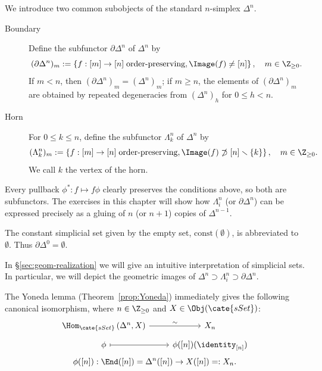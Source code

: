 \begin{example}\label{eg:boundary-horn}
	We introduce two common subobjects of the standard $n$-simplex $\Delta^n$.
	\begin{description}
		\item[Boundary] Define the subfunctor $\partial\Delta^n$ of $\Delta^n$
		by
		\[ (\partial \Delta^n)_m := \left\{ f: [m] \to [n] \; \text{order-preserving}, \Image(f) \neq [n] \right\}, \quad m \in \Z_{\geq 0}. \]
		If $m<n$, then $(\partial\Delta^n)_m=(\Delta^n)_m$; if $m\geq n$,
		the elements of $(\partial\Delta^n)_m$ are obtained by repeated
		degeneracies from $(\Delta^n)_h$ for $0\leq h<n$.
		\item[Horn] For $0\leq k\leq n$, define the subfunctor $\Lambda^n_k$
		of $\Delta^n$ by
		\[ (\Lambda^n_k)_m := \left\{ f: [m] \to [n] \;\text{order-preserving}, \Image(f) \not\supset [n] \smallsetminus \{k\} \right\}, \quad m \in \Z_{\geq 0}. \]
		We call $k$ the vertex of the horn.
	\end{description}

	Every pullback $\phi^*:f\mapsto f\phi$ clearly preserves the conditions
	above, so both are subfunctors. The exercises in this chapter will show how
	$\Lambda^n_i$ (or $\partial\Delta^n$) can be expressed precisely as a
	gluing of $n$ (or $n+1$) copies of $\Delta^{n-1}$.
\end{example}

The constant simplicial set given by the empty set,
$\mathrm{const}(\emptyset)$, is abbreviated to $\emptyset$. Thus
$\partial\Delta^0=\emptyset$.

In \S\ref{sec:geom-realization} we will give an intuitive interpretation of
simplicial sets. In particular, we will depict the geometric images of
$\Delta^n\supset\Lambda^n_i\supset\partial\Delta^n$.

The Yoneda lemma (Theorem~\ref{prop:Yoneda}) immediately gives the following
canonical isomorphism, where $n\in\Z_{\geq0}$ and
$X\in\Obj(\cate{sSet})$:
\begin{equation}\begin{gathered}
	\begin{tikzcd}[row sep=tiny]
		\Hom_{\cate{sSet}}\left( \Delta^n, X \right) \arrow[r, "\sim"] & X_n \\
		\phi \arrow[mapsto, r] & \phi([n])(\identity_{[n]})
	\end{tikzcd} \\
	\phi([n]): \End([n]) = \Delta^n([n]) \to X([n]) =: X_n.
\end{gathered}\end{equation}

